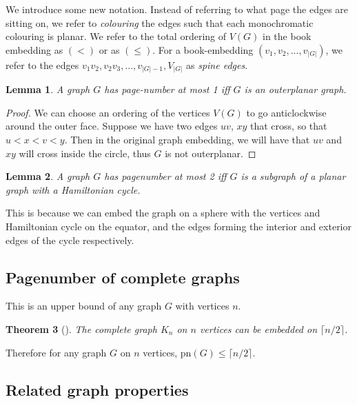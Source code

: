 \documentclass[]{report}
\newcommand{\pn}{\text{pn}}
\newtheorem{theorem}{Theorem}
\newtheorem{lemma}[theorem]{Lemma}
\theoremstyle{definition}
\numberwithin{theorem}{section}
\numberwithin{equation}{section}
\begin{document}
We introduce some new notation. Instead of referring to what page the edges are sitting on, we refer to \textit{colouring} the edges such that each monochromatic colouring is planar. We refer to the total ordering of $V(G)$ in the book embedding as $(<)$ or as $(\leq)$. For a book-embedding $(v_1, v_2, ..., v_{|G|})$, we refer to the edges $v_1 v_2, v_2 v_3, ..., v_{|G| - 1}, V_{|G|}$ as \textit{spine edges}.
\begin{lemma}\label{lem:Pagenumber_1}
	A graph $G$ has page-number at most 1 iff $G$ is an outerplanar graph.
\end{lemma}
\begin{proof}
	We can choose an ordering of the vertices $V(G)$ to go anticlockwise around the outer face. Suppose we have two edges $uv$, $xy$ that cross, so that $u < x < v < y$. Then in the original graph embedding, we will have that $uv$ and $xy$ will cross inside the circle, thus $G$ is not outerplanar. 
\end{proof}
\begin{lemma}\label{lem:Pagenumber_2}
	A graph $G$ has pagenumber at most 2 iff $G$ is a subgraph of a planar graph with a Hamiltonian cycle.
\end{lemma}
This is because we can embed the graph on a sphere with the vertices and Hamiltonian cycle on the equator, and the edges forming the interior and exterior edges of the cycle respectively.

\subsection{Pagenumber of complete graphs}\label{ssec:Pagenumber_Complete_Graphs}
This is an upper bound of any graph $G$ with vertices $n$. 
\begin{theorem}[\cite{bernhartBookThicknessGraph1979}]\label{thm:Pagenumber_Complete_Graph}
	The complete graph $K_n$ on $n$ vertices can be embedded on $\lceil n/2 \rceil$.
\end{theorem}
 Therefore for any graph $G$ on $n$ vertices, $\pn(G) \leq \lceil n/2 \rceil$. 

\subsection{Related graph properties}\label{ssec:Related_Properties}
\end{document}
